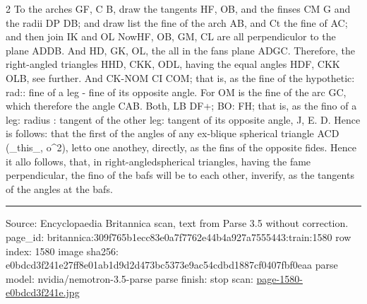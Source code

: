 \documentclass[10pt]{article}
\begin{document}
\begin{multicols}{2}
To the arches GF, C B, draw the tangents HF, OB, and the finses CM G and the radii DP DB; and draw list the fine of the arch AB, and Ct the fine of AC; and then join IK and OL NowHF, OB, GM, CL are all perpendiculor to the plane ADDB. And HD, GK, OL, the all in the fans plane ADGC. Therefore, the right-angled triangles HHD, CKK, ODL, having the equal angles HDF, CKK OLB, see further. And CK-NOM CI COM; that is, as the fine of the hypothetic: rad:: fine of a leg - fine of its opposite angle. For OM is the fine of the arc GC, which therefore the angle CAB. Both, LB DF+; BO: FH; that is, as the fino of a leg: radius : tangent of the other leg: tangent of its opposite angle, J, E. D. Hence is follows: that the first of the angles of any ex-blique spherical triangle ACD (\_this\_, o\textasciicircum{}2), letto one anothey, directly, as the fins of the opposite fides. Hence it allo follows, that, in right-angledspherical triangles, having the fame perpendicular, the fino of the bafs will be to each other, inverify, as the tangents of the angles at the bafs.

\end{multicols}
\vfill\par\noindent\rule{\linewidth}{0.4pt}\par
{\scriptsize\color{gray}\noindent Source: Encyclopaedia Britannica scan, text from Parse 3.5 without correction. page\_id: britannica:309f765b1ecc83e0a7f7762e44b4a927a7555443:train:1580 \quad row index: 1580 \quad image sha256: e0bdcd3f241e27ff8e01ab1d9d2d473bc5373e9ac54cdbd1887cf0407fbf0eaa \quad parse model: nvidia/nemotron-3.5-parse \quad parse finish: stop \quad scan: \href{../scans/page-1580-e0bdcd3f241e.jpg}{page-1580-e0bdcd3f241e.jpg}\par}
\end{document}
